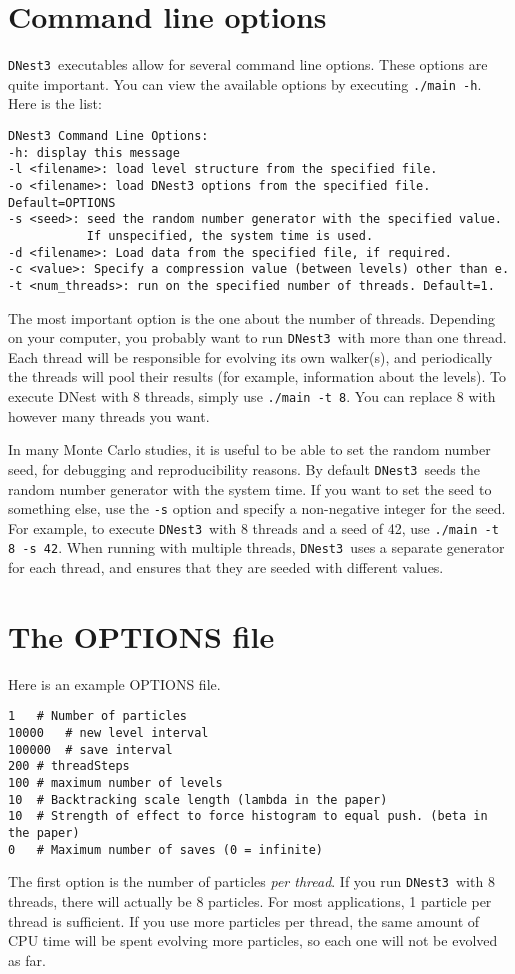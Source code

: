 \documentclass[a4paper, 11pt]{article}
\newcommand{\dnest}{{\tt DNest3}}
\begin{document}
\section{Command line options}
\dnest~executables allow for several command line options. These options are
quite important. You can view the available options by executing
{\tt ./main -h}. Here is the list:

\begin{verbatim}
DNest3 Command Line Options:
-h: display this message
-l <filename>: load level structure from the specified file.
-o <filename>: load DNest3 options from the specified file. Default=OPTIONS
-s <seed>: seed the random number generator with the specified value.
           If unspecified, the system time is used.
-d <filename>: Load data from the specified file, if required.
-c <value>: Specify a compression value (between levels) other than e.
-t <num_threads>: run on the specified number of threads. Default=1.
\end{verbatim}
The most important option is the one about the number of threads. Depending on
your computer, you probably want to run \dnest~with more than one thread.
Each thread will be responsible for evolving its own walker(s), and periodically
the threads will pool their results (for example, information about the
levels). To execute DNest with 8 threads, simply use {\tt ./main -t 8}. You can
replace 8 with however many threads you want.

In many Monte Carlo studies, it is useful to be able to set the random number
seed, for debugging and reproducibility reasons. By default \dnest~seeds the
random number generator with the system time. If you want to set the seed to
something else, use the {\tt -s} option and specify a non-negative integer for
the seed. For example, to execute \dnest~with
8 threads and a seed of 42, use {\tt ./main -t 8 -s 42}.
When running with multiple threads, \dnest~uses a separate generator for each
thread, and ensures that they are seeded with different values.

\section{The OPTIONS file}
Here is an example OPTIONS file.
\begin{verbatim}
1	# Number of particles
10000	# new level interval
100000	# save interval
200	# threadSteps
100	# maximum number of levels
10	# Backtracking scale length (lambda in the paper)
10	# Strength of effect to force histogram to equal push. (beta in the paper)
0	# Maximum number of saves (0 = infinite)
\end{verbatim}
The first option is the number of particles {\it per thread}. If you run
\dnest~with 8 threads, there will actually be 8 particles. For most
applications, 1 particle per thread is sufficient. If you use more particles
per thread, the same amount of CPU time will be spent evolving more particles,
so each one will not be evolved as far.
\end{document}
